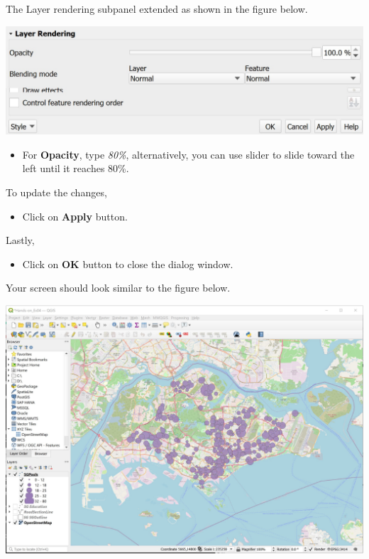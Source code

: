 \documentclass[
  letterpaper,
  DIV=11,
  numbers=noendperiod]{scrreprt}
\providecommand{\tightlist}{%
  \setlength{\itemsep}{0pt}\setlength{\parskip}{0pt}}\usepackage{longtable,booktabs,array}
\begin{document}
The Layer rendering subpanel extended as shown in the figure below.

\includegraphics{./img03/image15.jpg}

\begin{itemize}
\tightlist
\item
  For \textbf{Opacity}, type \emph{80\%}, alternatively, you can use
  slider to slide toward the left until it reaches 80\%.
\end{itemize}

To update the changes,

\begin{itemize}
\tightlist
\item
  Click on \textbf{Apply} button.
\end{itemize}

Lastly,

\begin{itemize}
\tightlist
\item
  Click on \textbf{OK} button to close the dialog window.
\end{itemize}

Your screen should look similar to the figure below.

\includegraphics{./img03/image16.jpg}
\end{document}
